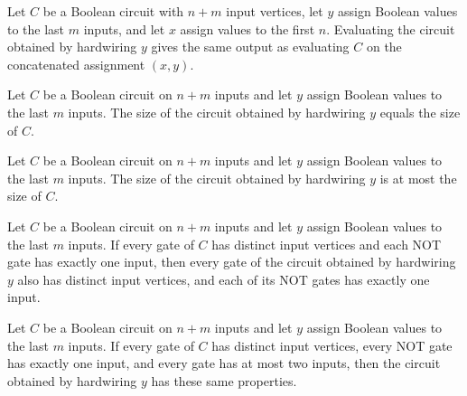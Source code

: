 \begin{theorem}
\label{BoolCircuit.DAGCircuit.hardwire_eval}
\leanok
{}
Let $C$ be a Boolean circuit with $n+m$ input vertices, let $y$ assign Boolean values to
the last $m$ inputs, and let $x$ assign values to the first $n$. Evaluating the circuit
obtained by hardwiring $y$ gives the same output as evaluating $C$ on the concatenated
assignment $(x,y)$.
\end{theorem}

\begin{theorem}
\label{BoolCircuit.DAGCircuit.hardwire_size}
\leanok
{}
Let $C$ be a Boolean circuit on $n+m$ inputs and let $y$ assign Boolean values to the
last $m$ inputs. The size of the circuit obtained by hardwiring $y$ equals the size of
$C$.
\end{theorem}

\begin{theorem}
\label{BoolCircuit.DAGCircuit.hardwire_size_le}
\leanok
{}
Let $C$ be a Boolean circuit on $n+m$ inputs and let $y$ assign Boolean values to the
last $m$ inputs. The size of the circuit obtained by hardwiring $y$ is at most the size
of $C$.
\end{theorem}

\begin{theorem}
\label{BoolCircuit.DAGCircuit.hardwire_isWellFormed}
\leanok
{}
Let $C$ be a Boolean circuit on $n+m$ inputs and let $y$ assign Boolean values to the
last $m$ inputs. If every gate of $C$ has distinct input vertices and each NOT gate has
exactly one input, then every gate of the circuit obtained by hardwiring $y$ also has
distinct input vertices, and each of its NOT gates has exactly one input.
\end{theorem}

\begin{theorem}
\label{BoolCircuit.DAGCircuit.hardwire_isFaninTwo}
\leanok
{}
Let $C$ be a Boolean circuit on $n+m$ inputs and let $y$ assign Boolean values to the
last $m$ inputs. If every gate of $C$ has distinct input vertices, every NOT gate has
exactly one input, and every gate has at most two inputs, then the circuit obtained by
hardwiring $y$ has these same properties.
\end{theorem}

